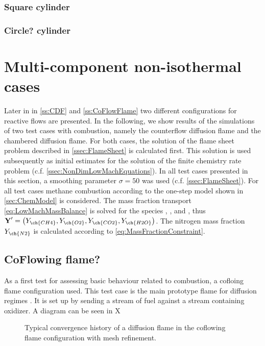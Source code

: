\subsubsection{Square cylinder}
\blindtext[5]
\subsubsection{Circle? cylinder}
\blindtext[5]



\section{Multi-component non-isothermal cases}\label{sec:MultCompNonIsothermCase}
Later in in \cref{ss:CDF} and \cref{ss:CoFlowFlame} two different configurations for reactive flows are presented.
In the following, we show results of the simulations of two test cases with combustion, namely the counterflow diffusion flame and the chambered diffusion flame. For both cases, the solution of the flame sheet problem described in \cref{ssec:FlameSheet} is calculated first. This solution is used subsequently as initial estimates for the solution of the finite chemistry rate problem (c.f. \cref{ssec:NonDimLowMachEquations}). In all test cases presented in this section, a smoothing parameter $\sigma = 50$ was used (c.f. \cref{ssec:FlameSheet}). For all test cases methane combustion according to the one-step model shown in \cref{sec:ChemModel} is considered. The mass fraction transport \cref{eq:LowMachMassBalance} is solved for the species , ,  and , thus $\vec{Y}' = \left(Y_{\ch{CH4}},Y_{\ch{O2}},Y_{\ch{CO2}},Y_{\ch{H2O}}\right)$. The nitrogen mass fraction $Y_{\ch{N2}}$ is calculated according to \cref{eq:MassFractionConstraint}.



\subsection{CoFlowing flame?}

As a first test for assessing basic behaviour related to combustion, a cofloing flame configuration used. This test case is the main prototype flame for diffusion regimes \cite{poinsotTheoreticalNumericalCombustion2005}. It is set up by sending a stream of fuel against a stream containing oxidizer. A diagram can be seen in X
\begin{figure}[t!]
	\centering
	\caption{Typical convergence history of a diffusion flame in the coflowing flame configuration with mesh refinement.}
	\label{fig:CoFlow_ConvergenceStory}
\end{figure}

